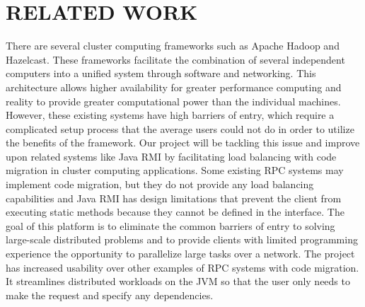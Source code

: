 \section{RELATED WORK}\label{sec:related}

There are several cluster computing frameworks such as Apache Hadoop and Hazelcast. These frameworks facilitate the combination of several independent computers into a unified system through software and networking. This architecture allows higher availability for greater performance computing and reality to provide greater computational power than the individual machines. However, these existing systems have high barriers of entry, which require a complicated
setup process that the average users could not do in order to utilize the benefits of the framework. Our project will be tackling this issue and improve upon
related systems like Java RMI by facilitating load balancing with
code migration in cluster computing applications.
Some existing RPC systems may implement code
migration, but they do not provide any load balancing
capabilities and Java RMI has design limitations
that prevent the client from executing static
methods because they cannot be defined in the interface.
The goal of this platform is to eliminate
the common barriers of entry to solving large-scale
distributed problems and to provide clients with
limited programming experience the opportunity to
parallelize large tasks over a network.
The project has increased usability over other
examples of RPC systems with code migration. It
streamlines distributed workloads on the JVM so
that the user only needs to make the request and
specify any dependencies.
